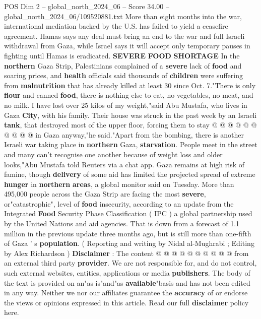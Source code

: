 \begin{textsample}{POS Dim 2 – global\_north\_2024\_06 – Score 34.00 – global\_north\_2024\_06/109520881.txt}
More than eight months into the war, international mediation backed by the U.S. has failed to yield a ceasefire agreement.
Hamas says any deal must bring an end to the war and full Israeli withdrawal from Gaza, while Israel says it will accept only temporary pauses in fighting until Hamas is eradicated. \textbf{SEVERE} \textbf{FOOD} \textbf{SHORTAGE} In the \textbf{northern} Gaza Strip, Palestinians complained of a \textbf{severe} lack of \textbf{food} and soaring prices, and \textbf{health} officials said thousands of \textbf{children} were suffering from \textbf{malnutrition} that has already killed at least 30 since Oct. 7."There is only \textbf{flour} and canned \textbf{food}, there is nothing else to eat, no vegetables, no meat, and no milk.
I have lost over 25 kilos of my weight,"said Abu Mustafa, who lives in Gaza \textbf{City}, with his family.
Their house was struck in the past week by an Israeli \textbf{tank}, that destroyed most of the upper floor, forcing them to stay @ @ @ @ @ @ @ @ @ @ in Gaza anyway,"he said."Apart from the bombing, there is another Israeli war taking place in \textbf{northern} Gaza, \textbf{starvation}.
People meet in the street and many can't recognise one another because of weight loss and older looks,"Abu Mustafa told Reuters via a chat app.
Gaza remains at high risk of famine, though \textbf{delivery} of some aid has limited the projected spread of extreme \textbf{hunger} in \textbf{northern} \textbf{areas}, a global monitor said on Tuesday.
More than 495,000 people across the Gaza Strip are facing the most \textbf{severe}, or"catastrophic", level of \textbf{food} insecurity, according to an update from the Integrated \textbf{Food} Security Phase Classification ( IPC ) a global partnership used by the United Nations and aid agencies.
That is down from a forecast of 1.1 million in the previous update three months ago, but is still more than one-fifth of Gaza ' s \textbf{population}. ( Reporting and writing by Nidal al-Mughrabi ; Editing by Alex Richardson ) \textbf{Disclaimer} : The content @ @ @ @ @ @ @ @ @ @ from an external third party \textbf{provider}.
We are not responsible for, and do not control, such external websites, entities, applications or media \textbf{publishers}.
The body of the text is provided on an"as is"and"as \textbf{available}"basis and has not been edited in any way.
Neither we nor our affiliates guarantee the \textbf{accuracy} of or endorse the views or opinions expressed in this article.
Read our full \textbf{disclaimer} policy here.

\end{textsample}
